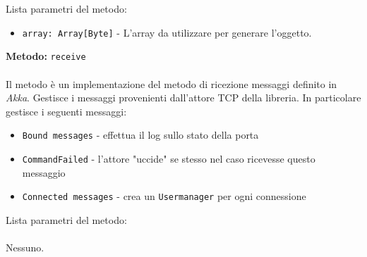 \documentclass[a4paper]{article}
\begin{document}
			Lista parametri del metodo:
			\begin{itemize}
				\item \texttt{array: Array[Byte]} - L'array da utilizzare per generare l'oggetto.
			\end{itemize}
		\textbf{Metodo: }\texttt{receive}
			\\ \\
			Il metodo è un implementazione del metodo di ricezione messaggi definito in \emph{Akka}. Gestisce i messaggi provenienti dall'attore TCP della libreria. In particolare gestisce i seguenti messaggi:
			\begin{itemize}
				\item \texttt{Bound messages} - effettua il log sullo stato della porta
				\item \texttt{CommandFailed} - l'attore "uccide" se stesso nel caso ricevesse questo messaggio
				\item \texttt{Connected messages} - crea un \texttt{Usermanager} per ogni connessione
			\end{itemize}
			Lista parametri del metodo:
			\\ \\
			Nessuno.
			
\end{document}
